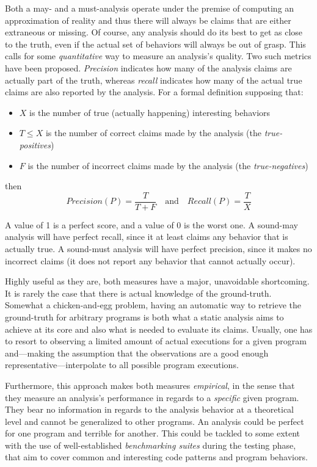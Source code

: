 Both a may- and a must-analysis operate under the premise of computing an approximation of reality and thus there will always be claims that are either extraneous or missing. Of course, any analysis should do its best to get as close to the truth, even if the actual set of behaviors will always be out of grasp. This calls for some \emph{quantitative} way to measure an analysis's quality. Two such metrics have been proposed. \emph{Precision} indicates how many of the analysis claims are actually part of the truth, whereas \emph{recall} indicates how many of the actual true claims are also reported by the analysis. For a formal definition supposing that:
\begin{itemize}
\item $X$ is the number of true (actually happening) interesting behaviors
\item $T \leq X$ is the number of correct claims made by the analysis (the \emph{true-positives})
\item $F$ is the number of incorrect claims made by the analysis (the \emph{true-negatives})
\end{itemize}
then
\[
Precision(P) = \frac{T}{T + F}
\quad \textrm{and} \quad
Recall(P) = \frac{T}{X}
\]

A value of 1 is a perfect score, and a value of 0 is the worst one. A sound-may analysis will have perfect recall, since it at least claims any behavior that is actually true. A sound-must analysis will have perfect precision, since it makes no incorrect claims (it does not report any behavior that cannot actually occur).

Highly useful as they are, both measures have a major, unavoidable shortcoming. It is rarely the case that there is actual knowledge of the ground-truth. Somewhat a chicken-and-egg problem, having an automatic way to retrieve the ground-truth for arbitrary programs is both what a static analysis aims to achieve at its core and also what is needed to evaluate its claims. Usually, one has to resort to observing a limited amount of actual executions for a given program and---making the assumption that the observations are a good enough representative---interpolate to all possible program executions.

Furthermore, this approach makes both measures \emph{empirical}, in the sense that they measure an analysis's performance in regards to a \emph{specific} given program. They bear no information in regards to the analysis behavior at a theoretical level and cannot be generalized to other programs. An analysis could be perfect for one program and terrible for another. This could be tackled to some extent with the use of well-established \emph{benchmarking suites} during the testing phase, that aim to cover common and interesting code patterns and program behaviors.


